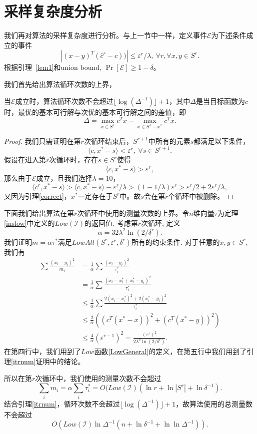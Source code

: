 \section{采样复杂度分析}

我们再对算法的采样复杂度进行分析。与上一节中一样，定义事件$\mathcal{E}$为下述条件成立的事件$$|(x-y)^T (\hat{c}^r - c))|\le \varepsilon^r /\lambda,\ \forall r, \forall x,y \in S^r.$$ 
根据引理~\ref{lem1}和union bound, $\Pr[\mathcal{E}]\ge 1-\delta$。

我们首先给出算法循环次数的上界，
\begin{lemma}\label{itrnum}
当$\mathcal{E}$成立时，算法循环次数不会超过$\lfloor \log(\Delta^{-1})\rfloor + 1$，其中$\Delta$是当目标函数为$c$时，最优的基本可行解与次优的基本可行解之间的差值，即
     \[
     \Delta = \max_{x\in S^1} c^T x - \max_{x\in S^1 - x^*} c^T x.
     \]
\end{lemma}
\begin{proof}
我们只需证明在第$r$次循环结束后，$S^{r+1}$中所有的元素$s$都满足以下条件，
\[
\langle c, x^* - s\rangle < \varepsilon^r, \ \forall s\in S^{r+1}.
\]
假设在进入第$r$次循环时，存在$s\in S^r$使得
\[
\langle c, x^* - s\rangle > \varepsilon^r,
\]
那么由于$\mathcal{E}$成立，且我们选择$\lambda=10$，
\[
\langle c^r, x^* - s\rangle > \langle c, x^* - s\rangle - \varepsilon^r/\lambda > (1-1/\lambda)\varepsilon^r  >\varepsilon^r/2 + 2\varepsilon^r/\lambda,
\]
又因为引理\ref{correct}，$x^*$一定存在于$S^r$中。故$s$会在第$r$个循环中被删除。
\end{proof}
下面我们给出算法在第$r$次循环中使用的测量次数的上界。令$n$维向量$\tau$为定理\ref{inslow}中定义的$Low(\mathcal{I})$的返回值. 考虑第$r$次循环, 定义$$\alpha = 32 \lambda^2 \ln(2/\delta^r).$$ 我们证明$m = \alpha \tau^*$满足$LowAll(S^r, \varepsilon^r, \delta^r)$所有的约束条件. 对于任意的$x,y\in S^r$, 我们有 
\begin{align*}
\sum \frac{(x_i-y_i)^2}{m_i} &= \frac{1}{\alpha} \sum \frac{(x_i-y_i)^2}{\tau_i^*}\\
& = \frac{1}{\alpha} \sum \frac{(x_i-x^*_i + x^*_i - y_i)^2}{\tau_i^*}\\
& \le \frac{1}{\alpha} \sum \frac{2(x_i-x^*_i)^2 + 2(x^*_i - y_i)^2}{\tau_i^*}\\
& \le \frac{2}{\alpha} \left((c^T(x^*-x))^2 + (c^T(x^* - y))^2\right)\\
& \le \frac{4}{\alpha} (\varepsilon^{r-1})^2 = \frac{(\varepsilon^r)^2}{2\lambda^2 \ln(2/\delta^r)}.
\end{align*}
在第四行中，我们用到了$Low$函数\ref{LowGeneral}的定义，在第五行中我们用到了引理\ref{itrnum}证明中的结论。

所以在第$r$次循环中，我们使用的测量次数不会超过
\[
\sum_i m_i = \alpha \sum_i \tau_i^* = O(Low(\mathcal{I})(\ln r + \ln |S^r| + \ln \delta^{-1}).
\]
结合引理\ref{itrnum}，循环次数不会超过$\lfloor \log(\Delta^{-1})\rfloor + 1$，故算法使用的总测量数不会超过
\[
O\left( Low(\mathcal{I}) \ln \Delta^{-1} ( n + \ln \delta^{-1} + \ln \ln \Delta^{-1})\right).
\]
